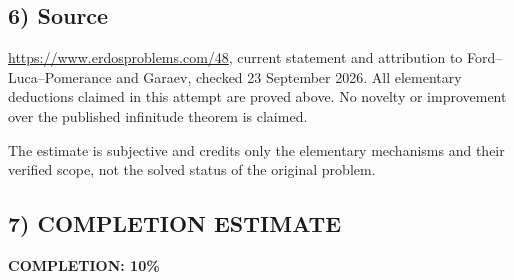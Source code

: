 \subsection*{6) Source}
\url{https://www.erdosproblems.com/48}, current statement and attribution to Ford--Luca--Pomerance and Garaev, checked 23 September 2026. All elementary deductions claimed in this attempt are proved above. No novelty or improvement over the published infinitude theorem is claimed.

The estimate is subjective and credits only the elementary mechanisms and their verified scope, not the solved status of the original problem.
\subsection*{7) COMPLETION ESTIMATE}
\textbf{COMPLETION: 10\%}
